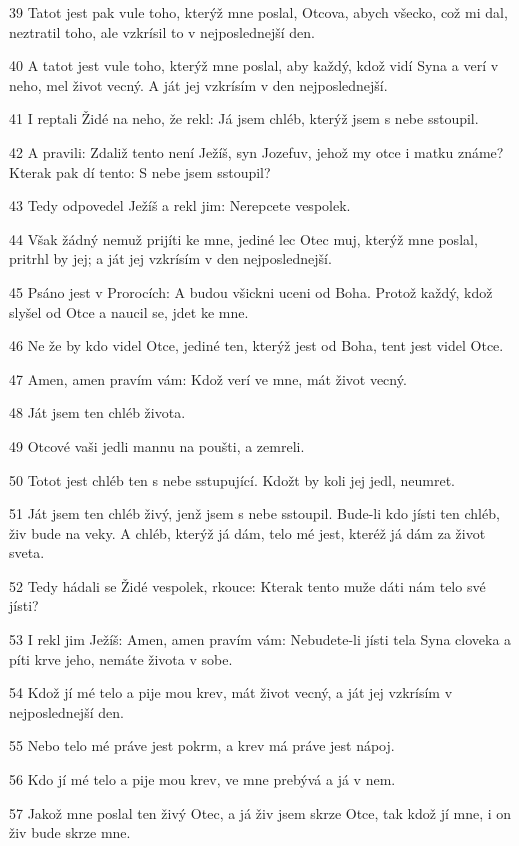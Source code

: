 \par 39 Tatot jest pak vule toho, kterýž mne poslal, Otcova, abych všecko, což mi dal, neztratil toho, ale vzkrísil to v nejposlednejší den.
\par 40 A tatot jest vule toho, kterýž mne poslal, aby každý, kdož vidí Syna a verí v neho, mel život vecný. A ját jej vzkrísím v den nejposlednejší.
\par 41 I reptali Židé na neho, že rekl: Já jsem chléb, kterýž jsem s nebe sstoupil.
\par 42 A pravili: Zdaliž tento není Ježíš, syn Jozefuv, jehož my otce i matku známe? Kterak pak dí tento: S nebe jsem sstoupil?
\par 43 Tedy odpovedel Ježíš a rekl jim: Nerepcete vespolek.
\par 44 Však žádný nemuž prijíti ke mne, jediné lec Otec muj, kterýž mne poslal, pritrhl by jej; a ját jej vzkrísím v den nejposlednejší.
\par 45 Psáno jest v Prorocích: A budou všickni uceni od Boha. Protož každý, kdož slyšel od Otce a naucil se, jdet ke mne.
\par 46 Ne že by kdo videl Otce, jediné ten, kterýž jest od Boha, tent jest videl Otce.
\par 47 Amen, amen pravím vám: Kdož verí ve mne, mát život vecný.
\par 48 Ját jsem ten chléb života.
\par 49 Otcové vaši jedli mannu na poušti, a zemreli.
\par 50 Totot jest chléb ten s nebe sstupující. Kdožt by koli jej jedl, neumret.
\par 51 Ját jsem ten chléb živý, jenž jsem s nebe sstoupil. Bude-li kdo jísti ten chléb, živ bude na veky. A chléb, kterýž já dám, telo mé jest, kteréž já dám za život sveta.
\par 52 Tedy hádali se Židé vespolek, rkouce: Kterak tento muže dáti nám telo své jísti?
\par 53 I rekl jim Ježíš: Amen, amen pravím vám: Nebudete-li jísti tela Syna cloveka a píti krve jeho, nemáte života v sobe.
\par 54 Kdož jí mé telo a pije mou krev, mát život vecný, a ját jej vzkrísím v nejposlednejší den.
\par 55 Nebo telo mé práve jest pokrm, a krev má práve jest nápoj.
\par 56 Kdo jí mé telo a pije mou krev, ve mne prebývá a já v nem.
\par 57 Jakož mne poslal ten živý Otec, a já živ jsem skrze Otce, tak kdož jí mne, i on živ bude skrze mne.
